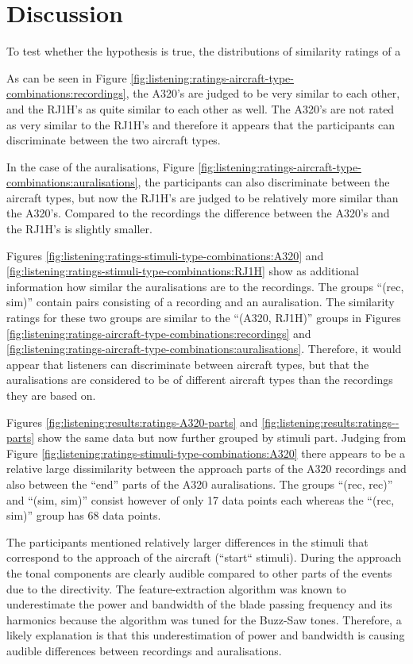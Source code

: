 \newpage
\section{Discussion}
To test whether the hypothesis is true, the distributions of similarity ratings of a

As can be seen in Figure
\ref{fig:listening:ratings-aircraft-type-combinations:recordings}, the A320's
are judged to be very similar to each other, and the RJ1H's as quite similar to
each other as well. The A320's are not rated as very similar to the RJ1H's and therefore
it appears that the participants can discriminate between the two aircraft
types.

In the case of the auralisations, Figure
\ref{fig:listening:ratings-aircraft-type-combinations:auralisations}, the
participants can also discriminate between the aircraft types, but now the
RJ1H's are judged to be relatively more similar than the A320's. Compared to the
recordings the difference between the A320's and the RJ1H's is slightly smaller.


Figures \ref{fig:listening:ratings-stimuli-type-combinations:A320} and
\ref{fig:listening:ratings-stimuli-type-combinations:RJ1H} show as additional
information how similar the auralisations are to the recordings. The groups
``(rec, sim)'' contain pairs consisting of a recording and an auralisation. The
similarity ratings for these two groups are similar to the ``(A320, RJ1H)''
groups in Figures
\ref{fig:listening:ratings-aircraft-type-combinations:recordings} and
\ref{fig:listening:ratings-aircraft-type-combinations:auralisations}. Therefore,
it would appear that listeners can discriminate between aircraft types, but that
the auralisations are considered to be of different aircraft types than the
recordings they are based on.

Figures \ref{fig:listening:results:ratings-A320-parts} and
\ref{fig:listening:results:ratings--parts} show the same data
but now further grouped by stimuli part. Judging from Figure
\ref{fig:listening:ratings-stimuli-type-combinations:A320} there appears to be a
relative large dissimilarity between the approach parts of the A320 recordings
and also between the ``end'' parts of the A320 auralisations. The groups ``(rec,
rec)'' and ``(sim, sim)'' consist however of only 17 data points each whereas
the ``(rec, sim)'' group has 68 data points.

The participants mentioned relatively larger differences in the stimuli that
correspond to the approach of the aircraft (``start`` stimuli). During the
approach the tonal components are clearly audible compared to other parts of the
events due to the directivity. The feature-extraction algorithm was known to
underestimate the power and bandwidth of the blade passing frequency and its
harmonics because the algorithm was tuned for the Buzz-Saw tones. Therefore, a
likely explanation is that this underestimation of power and bandwidth is
causing audible differences between recordings and auralisations.
